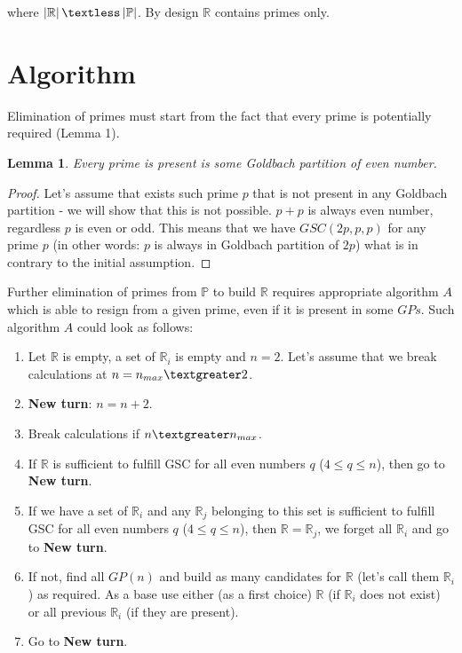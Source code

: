 \documentclass[10pt,twocolumn]{article}
\newtheorem{lemma}[theorem]{Lemma}
\begin{document}
where $\left\vert \mathbb{R} \right\vert \textless \left\vert \mathbb{P} \right\vert$. By design $\mathbb{R}$ contains primes only.

\section{Algorithm}

Elimination of primes must start from the fact that every prime is potentially required (Lemma 1).

\begin{lemma}
Every prime is present is some Goldbach partition of even number.
\end{lemma}
\begin{proof}
Let's assume that exists such prime $p$ that is not present in any Goldbach partition - we will show that this is not possible. $p + p$ is always even number, regardless $p$ is even or odd. This means that we have $GSC(2p, p, p)$ for any prime $p$ (in other words: $p$ is always in Goldbach partition of $2p$) what is in contrary to the initial assumption.
\end{proof}

Further elimination of primes from $\mathbb{P}$ to build $\mathbb{R}$ requires appropriate algorithm $A$ which is able to resign from a given prime, even if it is present in some $GPs$. Such algorithm $A$ could look as follows:

\begin{enumerate}
\item  Let $\mathbb{R}$ is empty, a set of $\mathbb{R}_i$ is empty and $n = 2$. Let's assume that we break calculations at $n = n_{max} \textgreater 2$.
\item  \textbf{New turn}: $n = n + 2$.
\item Break calculations if $n \textgreater n_{max}$.
\item  If  $\mathbb{R}$ is sufficient to fulfill GSC for all even numbers $q$ ($ 4 \leq q \leq n$), then go to \textbf{New turn}.
\item  If  we have a set of  $\mathbb{R}_i$ and any $\mathbb{R}_j$ belonging to this set is sufficient to fulfill GSC for all even numbers $q$ ($ 4 \leq q \leq n$), then $\mathbb{R} = \mathbb{R}_j$, we forget all $\mathbb{R}_i$ and go to \textbf{New turn}.
\item  If  not, find all $GP(n)$ and build as many candidates for $\mathbb{R}$ (let's call them $\mathbb{R}_i$) as required. As a base use either (as  a first choice) $\mathbb{R}$ (if $\mathbb{R}_i$ does not exist) or all previous $\mathbb{R}_i$ (if they are present).
\item Go to \textbf{New turn}.
\end{enumerate}
\end{document}
